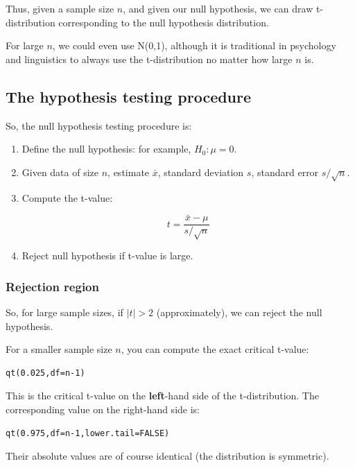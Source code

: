 \documentclass[12pt]{article}
\begin{document}
Thus, given a sample size $n$, and given our null hypothesis, we can draw t-distribution corresponding to the null hypothesis distribution.

For large $n$, we could even use N(0,1), although it is traditional in psychology and linguistics to always use the t-distribution no matter how large $n$ is.

\subsection{The hypothesis testing procedure}

So, the null hypothesis testing procedure is:

\begin{enumerate}
\item Define the null hypothesis: for example, $H_0: \mu = 0$.
\item Given data of size $n$, estimate $\bar{x}$, standard deviation $s$, standard error $s/\sqrt{n}$.
\item Compute the t-value:

\begin{equation}
t=\frac{\bar{x}-\mu}{s/\sqrt{n}}
\end{equation}
\item Reject null hypothesis if t-value is large.
\end{enumerate}

\subsubsection{Rejection region}

So, for large sample sizes, if $\mid t\mid >2$ (approximately), we can reject the null hypothesis. 

For a smaller sample size $n$, you can compute the exact critical t-value:

\begin{verbatim}
qt(0.025,df=n-1)
\end{verbatim}

This is the critical t-value on the \textbf{left}-hand side of the t-distribution.
The corresponding value on the right-hand side is:

\begin{verbatim}
qt(0.975,df=n-1,lower.tail=FALSE)
\end{verbatim}

Their absolute values are of course identical (the distribution is symmetric).
\end{document}
